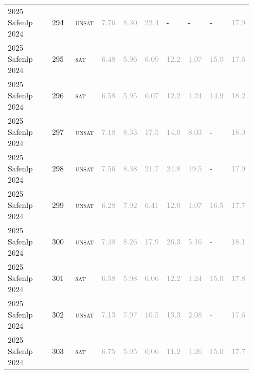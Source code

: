 \begin{center}
{\begin{longtable}{@{}llllllllll@{}}
2025 Safenlp 2024 & 294 & ~\textsc{unsat} & \textcolor{darkgray}{7.76} & \textcolor{darkgray}{8.30} & \textcolor{darkgray}{22.4} & - & - & - & \textcolor{darkgray}{17.9} \\
2025 Safenlp 2024 & 295 & ~\textsc{sat} & \textcolor{darkgray}{6.48} & \textcolor{darkgray}{5.96} & \textcolor{darkgray}{6.09} & \textcolor{darkgray}{12.2} & \textcolor{darkgray}{1.07} & \textcolor{darkgray}{15.0} & \textcolor{darkgray}{17.6} \\
2025 Safenlp 2024 & 296 & ~\textsc{sat} & \textcolor{darkgray}{6.58} & \textcolor{darkgray}{5.95} & \textcolor{darkgray}{6.07} & \textcolor{darkgray}{12.2} & \textcolor{darkgray}{1.24} & \textcolor{darkgray}{14.9} & \textcolor{darkgray}{18.2} \\
2025 Safenlp 2024 & 297 & ~\textsc{unsat} & \textcolor{darkgray}{7.18} & \textcolor{darkgray}{8.33} & \textcolor{darkgray}{17.5} & \textcolor{darkgray}{14.0} & \textcolor{darkgray}{8.03} & - & \textcolor{darkgray}{18.0} \\
2025 Safenlp 2024 & 298 & ~\textsc{unsat} & \textcolor{darkgray}{7.56} & \textcolor{darkgray}{8.38} & \textcolor{darkgray}{21.7} & \textcolor{darkgray}{24.8} & \textcolor{darkgray}{19.5} & - & \textcolor{darkgray}{17.9} \\
2025 Safenlp 2024 & 299 & ~\textsc{unsat} & \textcolor{darkgray}{6.28} & \textcolor{darkgray}{7.92} & \textcolor{darkgray}{6.41} & \textcolor{darkgray}{12.0} & \textcolor{darkgray}{1.07} & \textcolor{darkgray}{16.5} & \textcolor{darkgray}{17.7} \\
2025 Safenlp 2024 & 300 & ~\textsc{unsat} & \textcolor{darkgray}{7.48} & \textcolor{darkgray}{8.26} & \textcolor{darkgray}{17.9} & \textcolor{darkgray}{26.3} & \textcolor{darkgray}{5.16} & - & \textcolor{darkgray}{18.1} \\
2025 Safenlp 2024 & 301 & ~\textsc{sat} & \textcolor{darkgray}{6.58} & \textcolor{darkgray}{5.98} & \textcolor{darkgray}{6.06} & \textcolor{darkgray}{12.2} & \textcolor{darkgray}{1.24} & \textcolor{darkgray}{15.0} & \textcolor{darkgray}{17.8} \\
2025 Safenlp 2024 & 302 & ~\textsc{unsat} & \textcolor{darkgray}{7.13} & \textcolor{darkgray}{7.97} & \textcolor{darkgray}{10.5} & \textcolor{darkgray}{13.3} & \textcolor{darkgray}{2.08} & - & \textcolor{darkgray}{17.6} \\
2025 Safenlp 2024 & 303 & ~\textsc{sat} & \textcolor{darkgray}{6.75} & \textcolor{darkgray}{5.95} & \textcolor{darkgray}{6.06} & \textcolor{darkgray}{11.2} & \textcolor{darkgray}{1.26} & \textcolor{darkgray}{15.0} & \textcolor{darkgray}{17.7} \\

\end{longtable}}
\end{center}
